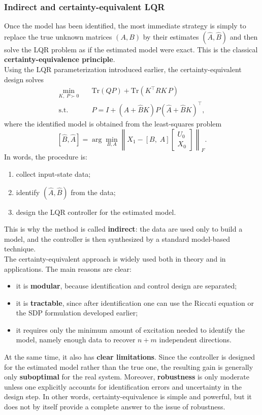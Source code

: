 \subsubsection{Indirect and certainty-equivalent LQR}

Once the model has been identified, the most immediate strategy is simply to replace the true
unknown matrices $(A,B)$ by their estimates $(\hat A,\hat B)$ and then solve the LQR problem as
if the estimated model were exact. This is the classical \textbf{certainty-equivalence principle}.\\
Using the LQR parameterization introduced earlier, the certainty-equivalent design solves
\[
\begin{aligned}
\min_{K,\;P \succ 0}\quad
& \text{Tr}(QP) + \text{Tr}(K^\top R K\,P) \\
\text{s.t.}\quad
& P = I + (\hat A+\hat B K)P(\hat A+\hat B K)^\top,
\end{aligned}
\]
where the identified model is obtained from the least-squares problem
\[
[\hat B,\hat A]
=
\arg\min_{B,A}
\left\|
X_1 - [B,\;A]
\begin{bmatrix}
U_0\\[0.3em]
X_0
\end{bmatrix}
\right\|_F.
\]
In words, the procedure is:
\begin{enumerate}
    \item collect input-state data;
    \item identify $(\hat A,\hat B)$ from the data;
    \item design the LQR controller for the estimated model.
\end{enumerate}
This is why the method is called \textbf{indirect}: the data are used only to build a model, and
the controller is then synthesized by a standard model-based technique.\\
The certainty-equivalent approach is widely used both in theory and in applications. The main
reasons are clear:
\begin{itemize}
    \item it is \textbf{modular}, because identification and control design are separated;
    \item it is \textbf{tractable}, since after identification one can use the Riccati equation or the SDP
    formulation developed earlier;
    \item it requires only the minimum amount of excitation needed to identify the model, namely
    enough data to recover $n+m$ independent directions.
\end{itemize}
At the same time, it also has \textbf{clear limitations}. Since the controller is designed for the estimated
model rather than the true one, the resulting gain is generally only \textbf{suboptimal} for the real
system. Moreover,\textbf{ robustness} is only moderate unless one explicitly accounts for identification
errors and uncertainty in the design step. In other words, certainty-equivalence is simple and
powerful, but it does not by itself provide a complete answer to the issue of robustness.

